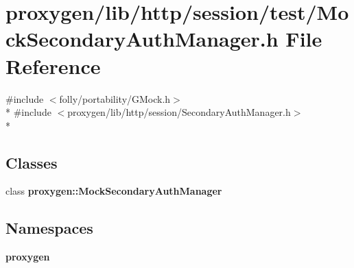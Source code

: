 \section{proxygen/lib/http/session/test/\+Mock\+Secondary\+Auth\+Manager.h File Reference}
\label{MockSecondaryAuthManager_8h}
{\ttfamily \#include $<$folly/portability/\+G\+Mock.\+h$>$}\\*
{\ttfamily \#include $<$proxygen/lib/http/session/\+Secondary\+Auth\+Manager.\+h$>$}\\*
\subsection*{Classes}
\begin{DoxyCompactItemize}
\item 
class {\bf proxygen\+::\+Mock\+Secondary\+Auth\+Manager}
\end{DoxyCompactItemize}
\subsection*{Namespaces}
\begin{DoxyCompactItemize}
\item 
 {\bf proxygen}
\end{DoxyCompactItemize}
